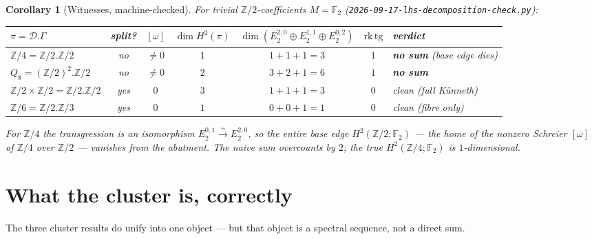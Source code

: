 \documentclass[11pt]{article}
\newtheorem{corollary}[theorem]{Corollary}
\theoremstyle{definition}
\newcommand{\D}{\mathcal{D}}
\newcommand{\Z}{\mathbb{Z}}
\newcommand{\tg}{\mathrm{tg}}
\begin{document}
\begin{corollary}[Witnesses, machine-checked]\label{cor:witness}
For trivial $\Z/2$-coefficients $M=\mathbb F_2$
\textup{(}\texttt{2026-09-17-lhs-decomposition-check.py}\textup{)}:
\begin{center}\small
\begin{tabular}{lcccccl}
\toprule
$\pi=\D.\Gamma$ & split? & $[\omega]$ & $\dim H^2(\pi)$ &
$\dim(E_2^{2,0}\!\oplus\!E_2^{1,1}\!\oplus\!E_2^{0,2})$ & $\mathrm{rk}\,\tg$ & verdict\\
\midrule
$\Z/4=\Z/2.\Z/2$          & no  & $\neq0$ & $1$ & $1{+}1{+}1=3$ & $1$ & \textbf{no sum} (base edge dies)\\
$Q_8=(\Z/2)^2.\Z/2$       & no  & $\neq0$ & $2$ & $3{+}2{+}1=6$ & $1$ & \textbf{no sum}\\
$\Z/2\times\Z/2=\Z/2.\Z/2$& yes & $0$     & $3$ & $1{+}1{+}1=3$ & $0$ & clean (full Künneth)\\
$\Z/6=\Z/2.\Z/3$          & yes & $0$     & $1$ & $0{+}0{+}1=1$ & $0$ & clean (fibre only)\\
\bottomrule
\end{tabular}
\end{center}
For $\Z/4$ the transgression is an isomorphism $E_2^{0,1}\xrightarrow{\sim}E_2^{2,0}$,
so the entire base edge $H^2(\Z/2;\mathbb F_2)$ --- the home of the nonzero Schreier
$[\omega]$ of $\Z/4$ over $\Z/2$ \cite{gzs} --- \emph{vanishes} from the
abutment. The naive sum overcounts by $2$; the true $H^2(\Z/4;\mathbb F_2)$ is
$1$-dimensional.
\end{corollary}

\section{What the cluster is, correctly}

The three cluster results do unify into one object --- but that object is a
spectral sequence, not a direct sum.
\end{document}
